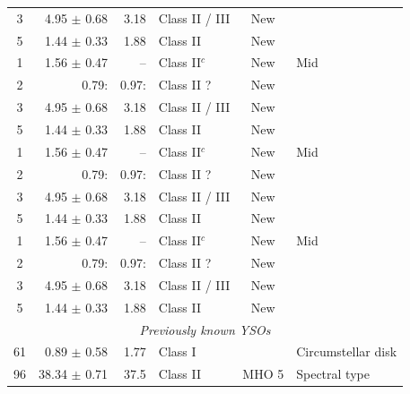 \documentclass{aa}
\begin{document}
\begin{appendix}
\begin{table}
\begin{tabular}{crrlcl}
			3         & 4.95 $\pm$ 0.68  & 3.18                & Class II / III & New            &                    \\
			5         & 1.44 $\pm$ 0.33  & 1.88                & Class II       & New            &                    \\
			1         & 1.56 $\pm$ 0.47  & --                  & Class II$^{c}$ & New            & Mid                \\
			2         & 0.79:            & 0.97:               & Class II ?     & New            &                    \\
			3         & 4.95 $\pm$ 0.68  & 3.18                & Class II / III & New            &                    \\
			5         & 1.44 $\pm$ 0.33  & 1.88                & Class II       & New            &                    \\
			1         & 1.56 $\pm$ 0.47  & --                  & Class II$^{c}$ & New            & Mid                \\
			2         & 0.79:            & 0.97:               & Class II ?     & New            &                    \\
			3         & 4.95 $\pm$ 0.68  & 3.18                & Class II / III & New            &                    \\
			5         & 1.44 $\pm$ 0.33  & 1.88                & Class II       & New            &                    \\
			1         & 1.56 $\pm$ 0.47  & --                  & Class II$^{c}$ & New            & Mid                \\
			2         & 0.79:            & 0.97:               & Class II ?     & New            &                    \\
			3         & 4.95 $\pm$ 0.68  & 3.18                & Class II / III & New            &                    \\
			5         & 1.44 $\pm$ 0.33  & 1.88                & Class II       & New            &                    \\
			\hline
			\multicolumn{6}{c}{\it Previously known YSOs}                                                             \\
			\hline
			61        & 0.89 $\pm$ 0.58  & 1.77                & Class I        & \object{HH 30} & Circumstellar disk \\
			96        & 38.34 $\pm$ 0.71 & 37.5                & Class II       & MHO 5          & Spectral type      \\
			\hline
		\end{tabular}
	\end{table}



\end{appendix}
\end{document}
